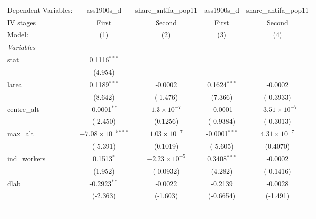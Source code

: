 
\begingroup
\centering
\begin{tabular}{lcccc}
   \tabularnewline \midrule \midrule
   Dependent Variables:             & ass1900s\_d                    & share\_antifa\_pop11   & ass1900s\_d     & share\_antifa\_pop11\\    
   IV stages                        & First                          & Second                 & First           & Second \\   
   Model:                           & (1)                            & (2)                    & (3)             & (4)\\  
   \midrule
   \emph{Variables}\\
   stat                             & 0.1116$^{***}$                 &                        &                 &   \\   
                                    & (4.954)                        &                        &                 &   \\   
   larea                            & 0.1189$^{***}$                 & -0.0002                & 0.1624$^{***}$  & -0.0002\\   
                                    & (8.642)                        & (-1.476)               & (7.366)         & (-0.3933)\\   
   centre\_alt                      & -0.0001$^{**}$                 & $1.3\times 10^{-7}$    & -0.0001         & $-3.51\times 10^{-7}$\\    
                                    & (-2.450)                       & (0.1256)               & (-0.9384)       & (-0.3013)\\   
   max\_alt                         & $-7.08\times 10^{-5}$$^{***}$  & $1.03\times 10^{-7}$   & -0.0001$^{***}$ & $4.31\times 10^{-7}$\\    
                                    & (-5.391)                       & (0.1019)               & (-5.605)        & (0.4070)\\   
   ind\_workers                     & 0.1513$^{*}$                   & $-2.23\times 10^{-5}$  & 0.3408$^{***}$  & -0.0002\\   
                                    & (1.952)                        & (-0.0932)              & (4.282)         & (-0.1416)\\   
   dlab                             & -0.2923$^{**}$                 & -0.0022                & -0.2139         & -0.0028\\   
                                    & (-2.363)                       & (-1.603)               & (-0.6654)       & (-1.491)\\   
$$
\end{tabular}
